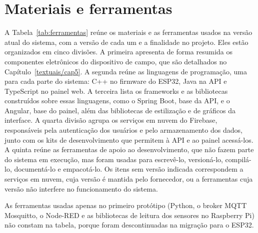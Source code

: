 \section{Materiais e ferramentas}
 
A Tabela~\ref{tab:ferramentas} reúne os materiais e as ferramentas usados na versão atual do sistema, com a versão de cada um e a finalidade no projeto. Eles estão organizados em cinco divisões. A primeira apresenta de forma resumida os componentes eletrônicos do dispositivo de campo, que são detalhados no Capítulo~\ref{textuais/cap5}. A segunda reúne as linguagens de programação, uma para cada parte do sistema: C++ no firmware do ESP32, Java na API e TypeScript no painel web. A terceira lista os frameworks e as bibliotecas construídos sobre essas linguagens, como o Spring Boot, base da API, e o Angular, base do painel, além das bibliotecas de estilização e de gráficos da interface. A quarta divisão agrupa os serviços em nuvem do Firebase, responsáveis pela autenticação dos usuários e pelo armazenamento dos dados, junto com os kits de desenvolvimento que permitem à API e ao painel acessá-los. A quinta reúne as ferramentas de apoio ao desenvolvimento, que não fazem parte do sistema em execução, mas foram usadas para escrevê-lo, versioná-lo, compilá-lo, documentá-lo e empacotá-lo. Os itens sem versão indicada correspondem a serviços em nuvem, cuja versão é mantida pelo fornecedor, ou a ferramentas cuja versão não interfere no funcionamento do sistema.

As ferramentas usadas apenas no primeiro protótipo (Python, o broker MQTT Mosquitto, o Node-RED e as bibliotecas de leitura dos sensores no Raspberry Pi) não constam na tabela, porque foram descontinuadas na migração para o ESP32.
 
